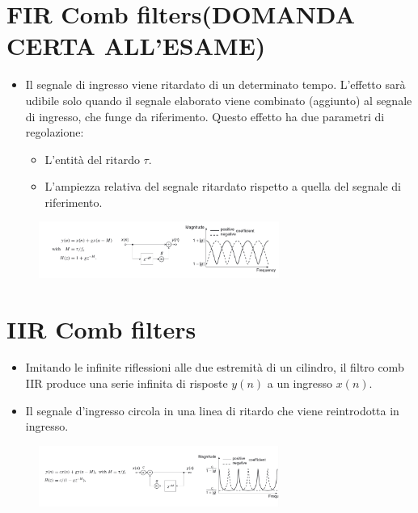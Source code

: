 \section{FIR Comb filters(DOMANDA CERTA ALL'ESAME)}

\begin{itemize}
    \item Il segnale di ingresso viene ritardato di un determinato tempo. L'effetto sarà udibile solo quando il segnale elaborato viene combinato (aggiunto) al segnale di ingresso, che funge da riferimento. Questo effetto ha due parametri di regolazione:
    
    \begin{itemize}
        \item L'entità del ritardo $\tau$.
        
        \item L'ampiezza relativa del segnale ritardato rispetto a quella del segnale di riferimento.
    \end{itemize}
\end{itemize}

\begin{figure}[H]
    \centering
    \includegraphics[width=0.7\textwidth]{capitoli/capitolo15/immagini/image8.png}
\end{figure}

\section{IIR Comb filters}

\begin{itemize}
    \item Imitando le infinite riflessioni alle due estremità di un cilindro, il filtro comb IIR produce una serie infinita di risposte $y(n)$ a un ingresso $x(n)$.
    
    \item Il segnale d'ingresso circola in una linea di ritardo che viene reintrodotta in ingresso.
\end{itemize}

\begin{figure}[H]
    \centering
    \includegraphics[width=0.7\textwidth]{capitoli/capitolo15/immagini/image9.png}
\end{figure}

